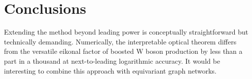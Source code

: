 \section{Conclusions}\label{sec:conclusions}

Extending the method beyond leading power is conceptually
straightforward but technically demanding. Numerically, the
interpretable optical theorem differs from the versatile eikonal factor
of boosted W boson production by less than a part in a thousand at
next-to-leading logarithmic accuracy. It would be interesting to combine
this approach with equivariant graph networks.

